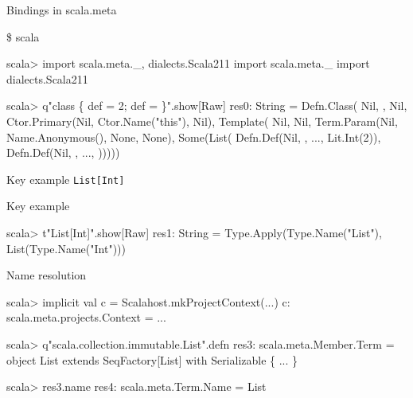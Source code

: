 \documentclass[svgnames,dvipsnames,hyperref={bookmarks=false},usepdftitle=false]{beamer}
\begin{document}
\begin{frame}[fragile]{Bindings in scala.meta}
\begin{semiverbatim}
\small
\$ scala

scala> import scala.meta.\_, dialects.Scala211
import scala.meta.\_
import dialects.Scala211

scala> q"class \text{\color{blue}{C}} \{ def \text{\color{red}{x}} = 2; def \text{\color{LimeGreen}{y}} = \text{\color{red}{x}} \}".show[Raw]
res0: String = Defn.Class(
  Nil, \text{\color{blue}{Type.Name("C")}}, Nil,
  Ctor.Primary(Nil, Ctor.Name("this"), Nil),
  Template(
    Nil, Nil,
    Term.Param(Nil, Name.Anonymous(), None, None),
    Some(List(
      Defn.Def(Nil, \text{\color{red}{Term.Name("x")}}, ..., Lit.Int(2)),
      Defn.Def(Nil, \text{\color{LimeGreen}{Term.Name("y")}}, ..., \text{\color{red}{Term.Name("x")}})))))
\end{semiverbatim}
\end{frame}

\begin{frame}[fragile]{Key example}
\texttt{List[Int]}
\end{frame}

\begin{frame}[fragile]{Key example}
\begin{semiverbatim}
\small
scala> t"List[Int]".show[Raw]
res1: String =
Type.Apply(Type.Name("List"), List(Type.Name("Int")))

\end{semiverbatim}
\end{frame}

\begin{frame}[fragile]{Name resolution}
\begin{semiverbatim}
scala> implicit val c = Scalahost.mkProjectContext(...)
c: scala.meta.projects.Context = ...

scala> q"scala.collection.immutable.List".defn
res3: scala.meta.Member.Term = object List extends
SeqFactory[List] with Serializable \{ ... \}

scala> res3.name
res4: scala.meta.Term.Name = List
\end{semiverbatim}
\end{frame}
\end{document}

